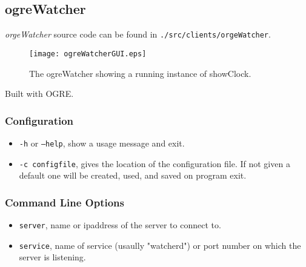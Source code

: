 
\subsection{ogreWatcher}

{\it orgeWatcher} source code can be found in {\tt .\slash src\slash clients\slash orgeWatcher}. 

\begin{figure}
\centering
\texttt{[image: ogreWatcherGUI.eps]}
\caption{The ogreWatcher showing a running instance of showClock.}
\label{ogreWatcher}
\end{figure}

Built with OGRE.

\subsubsection{Configuration}

\begin{itemize}
\item {\tt -h} or {\tt --help}, show a usage message and exit. 
\item {\tt -c configfile}, gives the location of the configuration file. If not given a default one will be created, used, and saved on program exit.
\end{itemize}

\subsubsection{Command Line Options}

\begin{itemize}
\item {\tt server}, name or ipaddress of the server to connect to.
\item {\tt service}, name of service (usaully "watcherd") or port number on which the server is listening.
\end{itemize}
